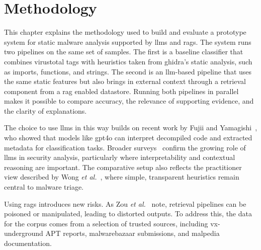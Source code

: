 \chapter{Methodology}\label{sec:Methodology}\label{Chapter3} %
This chapter explains the methodology used to build and evaluate a prototype system for static
\gls{malware} analysis supported by \glspl{llm} and \glspl{rag}. The system runs two pipelines on
the same set of samples. The first is a baseline classifier that combines \gls{virustotal} tags
with heuristics taken from \gls{ghidra}'s static analysis, such as imports, functions, and strings.
The second is an \gls{llm}-based pipeline that uses the same static features but also brings in
external context through a retrieval component from a \gls{rag} enabled datastore. Running both
pipelines in parallel makes it possible to compare accuracy, the relevance of supporting evidence,
and the clarity of explanations.

The choice to use \glspl{llm} in this way builds on recent work by Fujii and
Yamagishi~\cite{fujii2024llm}, who showed that models like \gls{gpt4o} can interpret decompiled
code and extracted metadata for classification tasks. Broader
surveys~\cite{nourmohammadzadeh2024llmsurvey,ferrag2024allinsights,metta2024generativeai} confirm
the growing role of \glspl{llm} in security analysis, particularly where interpretability and
contextual reasoning are important. The comparative setup also reflects the practitioner view
described by Wong \emph{et al.}~\cite{wong2021practice}, where simple, transparent heuristics
remain central to \gls{malware} triage.

Using \glspl{rag} introduces new risks. As Zou \emph{et al.}~\cite{zou2024poisonedrag} note,
retrieval pipelines can be poisoned or manipulated, leading to distorted outputs. To address this,
the data for the corpus comes from a selection of trusted sources, including \gls{vx-underground}
APT reports, \gls{malwarebazaar} submissions, and \gls{malpedia} documentation.

